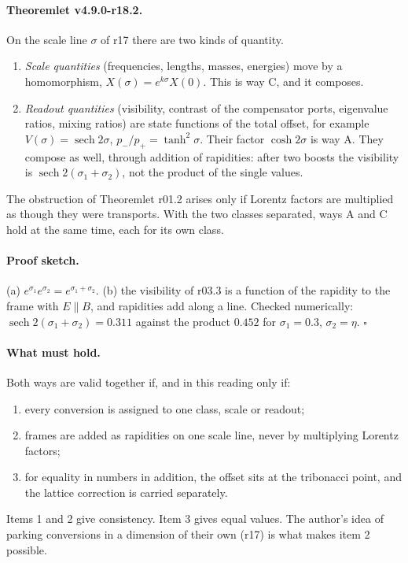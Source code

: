 \paragraph{Theoremlet v4.9.0-r18.2.}
On the scale line \(\sigma\) of r17 there are two kinds of quantity.
\begin{enumerate}[leftmargin=2em]
\item[(a)] \emph{Scale quantities} (frequencies, lengths, masses, energies) move by a homomorphism, \(X(\sigma)=e^{k\sigma}X(0)\).
This is way C, and it composes.
\item[(b)] \emph{Readout quantities} (visibility, contrast of the compensator ports, eigenvalue ratios, mixing ratios) are state
functions of the total offset, for example \(V(\sigma)=\operatorname{sech}2\sigma\), \(p_-/p_+=\tanh^2\sigma\).  Their factor
\(\cosh2\sigma\) is way A.  They compose as well, through addition of rapidities: after two boosts the visibility is
\(\operatorname{sech}2(\sigma_1+\sigma_2)\), not the product of the single values.
\end{enumerate}
The obstruction of Theoremlet r01.2 arises only if Lorentz factors are multiplied as though they were transports.  With the
two classes separated, ways A and C hold at the same time, each for its own class.

\paragraph{Proof sketch.}
(a) \(e^{\sigma_1}e^{\sigma_2}=e^{\sigma_1+\sigma_2}\).  (b) the visibility of r03.3 is a function of the rapidity to the frame
with \(E\parallel B\), and rapidities add along a line.  Checked numerically: \(\operatorname{sech}2(\sigma_1+\sigma_2)=0.311\) against
the product \(0.452\) for \(\sigma_1=0.3\), \(\sigma_2=\eta\).  \(\square\)

\paragraph{What must hold.}
Both ways are valid together if, and in this reading only if:
\begin{enumerate}[leftmargin=2em]
\item every conversion is assigned to one class, scale or readout;
\item frames are added as rapidities on one scale line, never by multiplying Lorentz factors;
\item for equality in numbers in addition, the offset sits at the tribonacci point, and the lattice correction is carried
separately.
\end{enumerate}
Items 1 and 2 give consistency.  Item 3 gives equal values.  The author's idea of parking conversions in a dimension of their own
(r17) is what makes item 2 possible.

